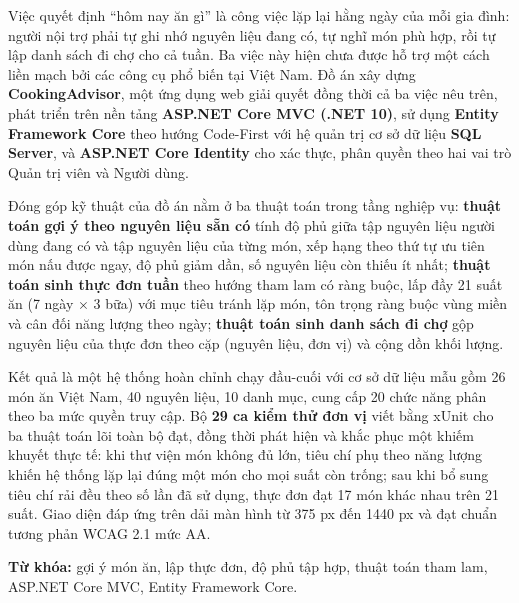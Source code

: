 
Việc quyết định ``hôm nay ăn gì'' là công việc lặp lại hằng ngày của mỗi gia
đình: người nội trợ phải tự ghi nhớ nguyên liệu đang có, tự nghĩ món phù hợp,
rồi tự lập danh sách đi chợ cho cả tuần. Ba việc này hiện chưa được hỗ trợ một
cách liền mạch bởi các công cụ phổ biến tại Việt Nam. Đồ án xây dựng
\textbf{CookingAdvisor}, một ứng dụng web giải quyết đồng thời cả ba việc nêu
trên, phát triển trên nền tảng \textbf{ASP.NET Core MVC (.NET 10)}, sử dụng
\textbf{Entity Framework Core} theo hướng Code-First với hệ quản trị cơ sở dữ
liệu \textbf{SQL Server}, và \textbf{ASP.NET Core Identity} cho xác thực, phân
quyền theo hai vai trò Quản trị viên và Người dùng.

Đóng góp kỹ thuật của đồ án nằm ở ba thuật toán trong tầng nghiệp vụ:
\textbf{thuật toán gợi ý theo nguyên liệu sẵn có} tính độ phủ giữa tập nguyên
liệu người dùng đang có và tập nguyên liệu của từng món, xếp hạng theo thứ tự
ưu tiên món nấu được ngay, độ phủ giảm dần, số nguyên liệu còn thiếu ít nhất;
\textbf{thuật toán sinh thực đơn tuần} theo hướng tham lam có ràng buộc, lấp đầy
21 suất ăn (7 ngày $\times$ 3 bữa) với mục tiêu tránh lặp món, tôn trọng ràng
buộc vùng miền và cân đối năng lượng theo ngày; \textbf{thuật toán sinh danh
sách đi chợ} gộp nguyên liệu của thực đơn theo cặp (nguyên liệu, đơn vị) và cộng
dồn khối lượng.

Kết quả là một hệ thống hoàn chỉnh chạy đầu-cuối với cơ sở dữ liệu mẫu gồm 26
món ăn Việt Nam, 40 nguyên liệu, 10 danh mục, cung cấp 20 chức năng phân theo ba
mức quyền truy cập. Bộ \textbf{29 ca kiểm thử đơn vị} viết bằng xUnit cho ba
thuật toán lõi toàn bộ đạt, đồng thời phát hiện và khắc phục một khiếm khuyết
thực tế: khi thư viện món không đủ lớn, tiêu chí phụ theo năng lượng khiến hệ
thống lặp lại đúng một món cho mọi suất còn trống; sau khi bổ sung tiêu chí rải
đều theo số lần đã sử dụng, thực đơn đạt 17 món khác nhau trên 21 suất. Giao
diện đáp ứng trên dải màn hình từ 375 px đến 1440 px và đạt chuẩn tương phản
WCAG 2.1 mức AA.

\vspace{6pt}
\noindent\textbf{Từ khóa:} gợi ý món ăn, lập thực đơn, độ phủ tập hợp, thuật
toán tham lam, ASP.NET Core MVC, Entity Framework Core.
